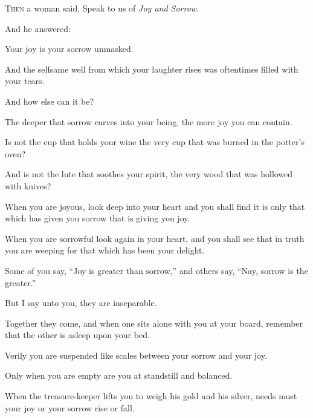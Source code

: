 \lettrine{T}{hen} a woman said, Speak to us of
\textit{Joy and Sorrow}.

\medskip
And he answered:

Your joy is your sorrow unmasked.

And the selfsame well from which your
laughter rises was oftentimes filled
with your tears.

And how else can it be?

The deeper that sorrow carves into your
being, the more joy you can contain.

Is not the cup that holds your wine the
very cup that was burned in the potter’s
oven?

And is not the lute that soothes your
spirit, the very wood that was hollowed
with knives?

When you are joyous, look deep into your
heart and you shall find it is only
that which has given you sorrow that is
giving you joy.

When you are sorrowful look again in
your heart, and you shall see that
in truth you are weeping for that which
has been your delight.


Some of you say, \enquote{Joy is greater than
sorrow,} and others say, \enquote{Nay, sorrow is
the greater.}

But I say unto you, they are
inseparable.

Together they come, and when one sits
alone with you at your board, remember
that the other is asleep upon your bed.

Verily you are suspended like scales
between your sorrow and your joy.

Only when you are empty are you at
standstill and balanced.

When the treasure-keeper lifts you to
weigh his gold and his silver, needs
must your joy or your sorrow rise or
fall.
